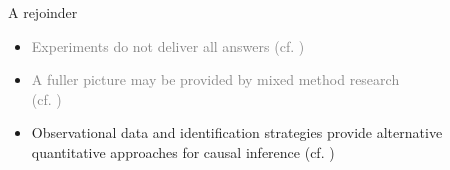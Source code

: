 \documentclass[aspectratio=169]{beamer}
\begin{document}
	\begin{frame}{A rejoinder}
	 	\begin{itemize}[<+->]
			\item \textcolor<2->{gray}{Experiments do not deliver all answers (cf. \cite{Howe2004})}
			\item \textcolor<3->{gray}{A fuller picture may be provided by mixed method research \\ (cf. \cite{Latour2012,Lund2012,Blok2014})}
			\item Observational data and identification strategies provide alternative quantitative approaches for causal inference (cf. \cite{Gelman2014})
	 	\end{itemize}
	 	\vspace*{.5cm}
	\end{frame}
\end{document}
